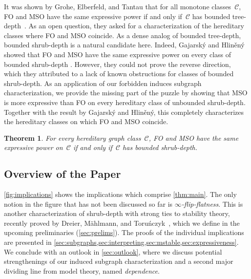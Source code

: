 \documentclass[11pt]{article}      \usepackage[margin=1in]{geometry}  \usepackage{microtype}
\newtheorem{theorem}{Theorem}[section]
\theoremstyle{definition}
\newcommand{\CC}{\mathcal{C}}
\begin{document}
It was shown by Grohe, Elberfeld, and Tantau that for all monotone classes~$\CC$, FO and MSO have the same expressive power if and only if~$\CC$ has bounded tree-depth~\cite{elberfeld2016}.
As an open question, they asked for a characterization of the hereditary classes where FO and MSO coincide.
As a dense analog of bounded tree-depth, bounded shrub-depth is a natural candidate here.
Indeed, Gajarsk\'{y} and Hlin\v{e}n\'{y} showed that
FO and MSO have the same expressive power on every class of bounded shrub-depth \cite[Thm.\ 5.14]{gajarsky2015kernelizing}.
However, they could not prove the reverse direction, which they attributed to a lack of known obstructions for classes of bounded shrub-depth.
As an application of our forbidden induces subgraph characterization, we provide the missing part of the puzzle by showing that MSO is more expressive than FO on every hereditary class of unbounded shrub-depth.
Together with the result by Gajarsk\'{y} and Hlin\v{e}n\'{y}, this completely characterizes the hereditary classes on which FO and MSO coincide.

\begin{theorem}
  For every hereditary graph class~$\CC$, FO and MSO have the same expressive power on~$\CC$ if and only if~$\CC$ has bounded shrub-depth.
\end{theorem}


\subsection*{Overview of the Paper}

\cref{fig:implications} shows the implications which comprise \cref{thm:main}.
The only notion in the figure that has not been discussed so far is \emph{$\infty$-flip-flatness}.
This is another characterization of shrub-depth with strong ties to stability theory, recently proved by Dreier, Mählmann, and Toru\'{n}czyk~\cite{dreier2024flipbreakability},
which we define in the upcoming preliminaries (\cref{sec:prelims}).
The proofs of the individual implications are presented in \cref{sec:subgraphs,sec:interpreting,sec:mstable,sec:expressiveness}.
We conclude with an outlook in \cref{sec:outlook}, where we discuss potential strengthenings of our induced subgraph characterization and a second major dividing line from model theory, named \emph{dependence}.
\end{document}
